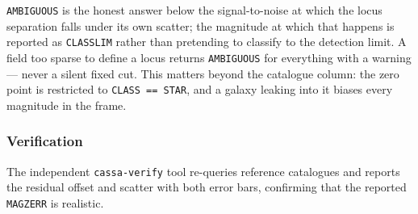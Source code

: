 \documentclass[11pt,a4paper]{article}
\begin{document}
\texttt{AMBIGUOUS} is the honest answer below the signal-to-noise at which the
locus separation falls under its own scatter; the magnitude at which that
happens is reported as \texttt{CLASSLIM} rather than pretending to classify to
the detection limit. A field too sparse to define a locus returns
\texttt{AMBIGUOUS} for everything with a warning --- never a silent fixed cut.
This matters beyond the catalogue column: the zero point is restricted to
\texttt{CLASS == STAR}, and a galaxy leaking into it biases every magnitude in
the frame.

\subsubsection{Verification}
The independent \texttt{cassa-verify} tool re-queries reference catalogues and
reports the residual offset and scatter with both error bars, confirming that
the reported \texttt{MAGZERR} is realistic.

\newpage
\end{document}
